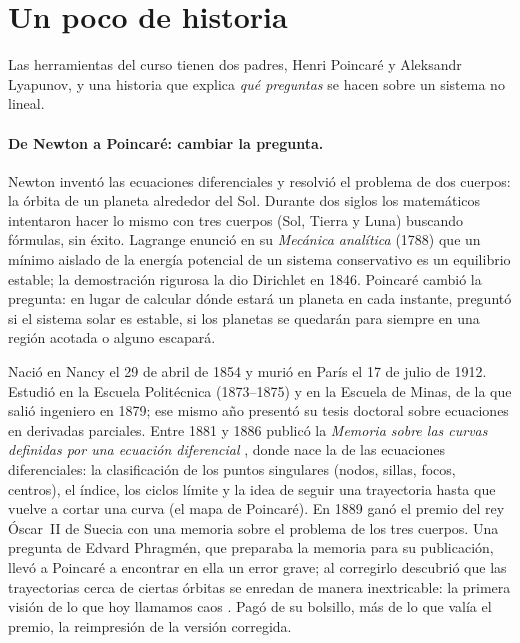 \section{Un poco de historia}
\label{sec:in-historia}

Las herramientas del curso tienen dos padres, Henri Poincaré y Aleksandr Lyapunov, y una historia que explica \emph{qué preguntas} se hacen sobre un sistema no lineal.

\paragraph{De Newton a Poincaré: cambiar la pregunta.} Newton inventó las ecuaciones diferenciales y resolvió el problema de dos cuerpos: la órbita de un planeta alrededor del Sol. Durante dos siglos los matemáticos intentaron hacer lo mismo con tres cuerpos (Sol, Tierra y Luna) buscando fórmulas, sin éxito. Lagrange enunció en su \emph{Mecánica analítica} (1788) que un mínimo aislado de la energía potencial de un sistema conservativo es un equilibrio estable; la demostración rigurosa la dio Dirichlet en 1846. Poincaré cambió la pregunta: en lugar de calcular dónde estará un planeta en cada instante, preguntó si el sistema solar es estable, si los planetas se quedarán para siempre en una región acotada o alguno escapará.

\begin{historia}
Nació en Nancy el 29 de abril de 1854 y murió en París el 17 de julio de 1912. Estudió en la Escuela Politécnica (1873--1875) y en la Escuela de Minas, de la que salió ingeniero en 1879; ese mismo año presentó su tesis doctoral sobre ecuaciones en derivadas parciales. Entre 1881 y 1886 publicó la \emph{Memoria sobre las curvas definidas por una ecuación diferencial} \citep{Poi1881}, donde nace la  de las ecuaciones diferenciales: la clasificación de los puntos singulares (nodos, sillas, focos, centros), el índice, los ciclos límite y la idea de seguir una trayectoria hasta que vuelve a cortar una curva (el mapa de Poincaré). En 1889 ganó el premio del rey Óscar~II de Suecia con una memoria sobre el problema de los tres cuerpos. Una pregunta de Edvard Phragmén, que preparaba la memoria para su publicación, llevó a Poincaré a encontrar en ella un error grave; al corregirlo descubrió que las trayectorias cerca de ciertas órbitas se enredan de manera inextricable: la primera visión de lo que hoy llamamos caos \citep{Poi1890}. Pagó de su bolsillo, más de lo que valía el premio, la reimpresión de la versión corregida.
\end{historia}

